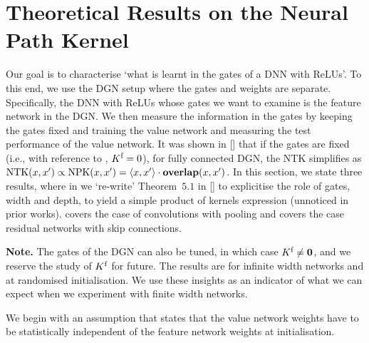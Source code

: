\section{Theoretical Results on the Neural Path Kernel}\label{sec:theory}
Our goal is to characterise `what is learnt in the gates of a DNN with ReLUs'. To this end, we use the DGN setup where the gates and weights are separate. Specifically, the DNN with ReLUs whose gates we want to examine is the feature network in the DGN. We then measure the information in the gates by keeping the gates fixed and training the value network and measuring the test performance of the value network. It was shown in [] that if the gates are fixed  (i.e., with reference to , $K^{\text{f}}=0$), for fully connected DGN, the NTK simplifies as $\text{NTK}(x,x')\propto \text{NPK}(x,x') = \langle x,x'\rangle\cdot {\bf{overlap}}(x,x')$. In this section, we state three results, where in  we `re-write' Theorem~$5.1$ in [] to explicitise the role of gates, width and depth, to yield a simple product of kernels expression (unnoticed in prior works).   covers the case of convolutions with pooling and  covers the case residual networks with skip connections.

\textbf{Note.} The gates of the DGN can also be tuned, in which case $K^{\text{f}}\neq \mathbf{0}$, and we reserve the study of $K^{\text{f}}$ for future. The results are for infinite width networks and at randomised initialisation. We use these insights as an indicator of what we can expect when we experiment with finite width networks. 

We begin with an assumption that states that the value network weights have to be statistically independent of the feature network weights at initialisation. %


